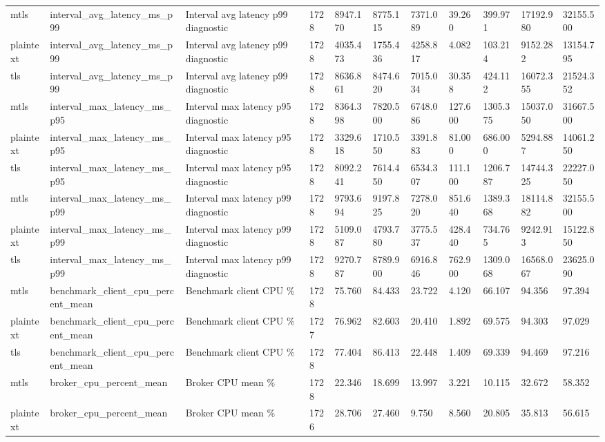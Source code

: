 \begin{longtable}{lllllllllll}
mtls & interval\_avg\_latency\_ms\_p99 & Interval avg latency p99 diagnostic & 1728 & 8947.170 & 8775.115 & 7371.089 & 39.260 & 399.971 & 17192.980 & 32155.500 \\
plaintext & interval\_avg\_latency\_ms\_p99 & Interval avg latency p99 diagnostic & 1728 & 4035.473 & 1755.436 & 4258.817 & 4.082 & 103.214 & 9152.282 & 13154.795 \\
tls & interval\_avg\_latency\_ms\_p99 & Interval avg latency p99 diagnostic & 1728 & 8636.861 & 8474.620 & 7015.034 & 30.358 & 424.112 & 16072.355 & 21524.352 \\
mtls & interval\_max\_latency\_ms\_p95 & Interval max latency p95 diagnostic & 1728 & 8364.398 & 7820.500 & 6748.086 & 127.600 & 1305.375 & 15037.050 & 31667.500 \\
plaintext & interval\_max\_latency\_ms\_p95 & Interval max latency p95 diagnostic & 1728 & 3329.618 & 1710.550 & 3391.883 & 81.000 & 686.000 & 5294.887 & 14061.250 \\
tls & interval\_max\_latency\_ms\_p95 & Interval max latency p95 diagnostic & 1728 & 8092.241 & 7614.450 & 6534.307 & 111.100 & 1206.787 & 14744.325 & 22227.050 \\
mtls & interval\_max\_latency\_ms\_p99 & Interval max latency p99 diagnostic & 1728 & 9793.694 & 9197.825 & 7278.020 & 851.640 & 1389.368 & 18114.882 & 32155.500 \\
plaintext & interval\_max\_latency\_ms\_p99 & Interval max latency p99 diagnostic & 1728 & 5109.087 & 4793.780 & 3775.537 & 428.440 & 734.765 & 9242.913 & 15122.850 \\
tls & interval\_max\_latency\_ms\_p99 & Interval max latency p99 diagnostic & 1728 & 9270.787 & 8789.900 & 6916.846 & 762.900 & 1309.068 & 16568.067 & 23625.090 \\
mtls & benchmark\_client\_cpu\_percent\_mean & Benchmark client CPU \% & 1728 & 75.760 & 84.433 & 23.722 & 4.120 & 66.107 & 94.356 & 97.394 \\
plaintext & benchmark\_client\_cpu\_percent\_mean & Benchmark client CPU \% & 1727 & 76.962 & 82.603 & 20.410 & 1.892 & 69.575 & 94.303 & 97.029 \\
tls & benchmark\_client\_cpu\_percent\_mean & Benchmark client CPU \% & 1728 & 77.404 & 86.413 & 22.448 & 1.409 & 69.339 & 94.469 & 97.216 \\
mtls & broker\_cpu\_percent\_mean & Broker CPU mean \% & 1728 & 22.346 & 18.699 & 13.997 & 3.221 & 10.115 & 32.672 & 58.352 \\
plaintext & broker\_cpu\_percent\_mean & Broker CPU mean \% & 1726 & 28.706 & 27.460 & 9.750 & 8.560 & 20.805 & 35.813 & 56.615 \\

\end{longtable}

